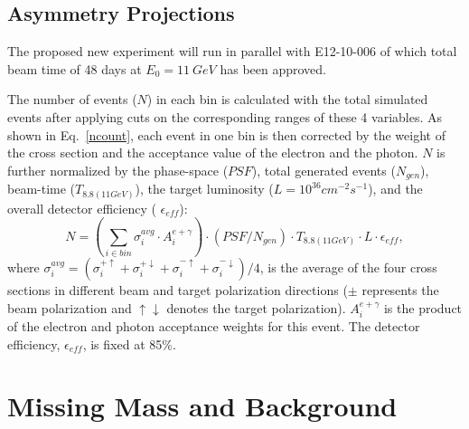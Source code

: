 \subsection{Asymmetry Projections}
The proposed new experiment will run in parallel with E12-10-006 of which total beam time of 48 days at $E_{0}=11~GeV$ has been approved.  

The number of events ($N$) in each bin is calculated with the total simulated events after applying cuts on the corresponding ranges of these 4 variables. As shown in Eq.~\ref{ncount}, each event in one bin is then corrected by the weight of the cross section and the acceptance value of the electron and the photon. $N$ is further normalized by the phase-space ($PSF$), total generated events ($N_{gen}$), beam-time ($T_{8.8(11GeV)}$), the target luminosity ($L=10^{36} cm^{-2}s^{-1}$), and the overall detector efficiency ( $\epsilon_{eff}$):
 \begin{equation}
     N = (\sum_{i\in bin} \sigma^{avg}_{i}\cdot A^{e+\gamma}_{i}) \cdot (PSF/N_{gen}) \cdot T_{8.8(11GeV)} \cdot L \cdot \epsilon_{eff},
     \label{ncount}
 \end{equation}
 where $\sigma^{avg}_{i}=(\sigma^{+\uparrow}_{i}+\sigma^{+\downarrow}_{i}+\sigma^{-\uparrow}_{i}+\sigma^{-\downarrow}_{i})/4$, is the average of the four cross sections in different beam and target polarization directions ($\pm$ represents the beam polarization and $\uparrow\downarrow$ denotes the target polarization). $A^{e+\gamma}_{i}$ is the product of the electron and photon acceptance weights for this event. The detector efficiency, $\epsilon_{eff}$, is fixed at 85\%. 

\section {Missing Mass and Background}

